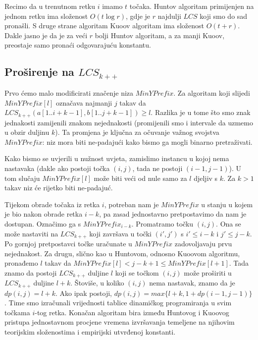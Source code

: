 \documentclass[times, utf8, seminar, numeric]{fer}
\begin{document}
Recimo da u trenutnom retku $i$ imamo $t$ točaka. Huntov algoritam
primijenjen na jednom retku ima složenost $O(t \log r)$, gdje je
$r$ najdulji $LCS$ koji smo do sad pronašli. S druge strane algoritam
Kuoov algoritam ima složenost $O(t + r)$. Dakle jasno je da je za
veći $r$ bolji Huntov algoritam, a za manji Kuoov, preostaje samo
pronaći odgovarajuću konstantu.

\subsection{Proširenje na $LCS_{k++}$}
Prvo ćemo malo modificirati značenje niza $MinYPrefix$.
Za algoritam koji slijedi $MinYPrefix[l]$ označava najmanji $j$
takav da $LCS_{k++}(a[1..i+k-1], b[1..j+k-1]) \ge l$. Razlika je
u tome što smo znak jednakosti zamijenili znakom nejednakosti
(promijenili smo i intervale da uzmemo u obzir duljinu $k$). 
Ta promjena je ključna za očuvanje važnog svojstva $MinYPrefix$:
niz mora biti ne-padajući kako bismo ga mogli binarno pretraživati.

Kako bismo se uvjerili u nužnost uvjeta, zamislimo instancu u kojoj
nema nastavaka (dakle ako postoji točka $(i, j)$, tada ne postoji
$(i-1, j-1)$). U tom slučaju $MinYPrefix[l]$ može biti veći od
nule samo za $l$ djeljiv s $k$. Za $k > 1$ takav niz će rijetko
biti ne-padajuć.

Tijekom obrade točaka iz retka $i$, potreban nam je $MinYPrefix$ u
stanju u kojem je bio nakon obrade retka $i-k$, pa zasad
jednostavno pretpostavimo da nam je dostupan. Označimo ga s
$MinYPrefix_{i-k}$. Promatramo točku $(i, j)$. Ona se može
nastaviti na $LCS_{k++}$ koji završava u točki $(i', j')$ s $i' \le
i - k$ i $j' \le j - k$. Po gornjoj pretpostavci točke uračunate u
$MinYPrefix$ zadovoljavaju prvu nejednakost. Za drugu, slično kao
u Huntovom, odnosno Kuoovom algoritmu, pronađemo $l$ takav da
$MinYPrefix[l] < j - k + 1 \le MinYPrefix[l+1]$. Tada znamo da
postoji $LCS_{k++}$ duljine $l$ koji se točkom $(i, j)$ može
proširiti u $LCS_{k++}$ duljine $l+k$. Štoviše, u koliko $(i, j)$
nema nastavak, znamo da je $dp(i, j) = l+k$.  Ako ipak postoji,
$dp(i, j) = max\{l+k, 1+dp(i-1, j-1)\}$. Time smo izračunali
vrijednosti tablice dinamičkog programiranja u svim točkama
$i$-tog retka. Konačan algoritam bira između Huntovog i Kuoovog
pristupa jednostavnom procjene vremena izvršavanja temeljene na
njihovim teorijskim složenostima i empirijski utvrđenoj konstanti.
\end{document}
